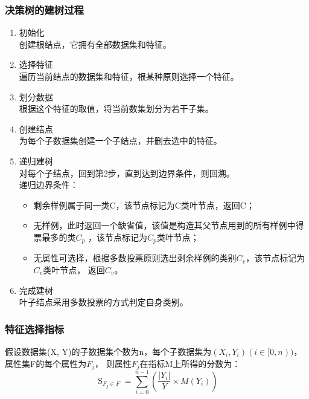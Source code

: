 \documentclass[UTF8,a4paper,12pt]{article}
\begin{document}
\subsubsection{决策树的建树过程}
\begin{enumerate}[itemindent=0.5em,label=\arabic*、]
  \item 初始化\\创建根结点，它拥有全部数据集和特征。
  \item 选择特征\\遍历当前结点的数据集和特征，根某种原则选择一个特征。
  \item 划分数据\\根据这个特征的取值，将当前数集划分为若干子集。
  \item 创建结点\\为每个子数据集创建一个子结点，并删去选中的特征。
  \item 递归建树\\对每个子结点，回到第2步，直到达到边界条件，则回溯。\\
  递归边界条件：
  \begin{itemize}
    \item 剩余样例属于同一类C，该节点标记为C类叶节点，返回C；
    \item 无样例，此时返回一个缺省值，该值是构造其父节点用到的所有样例中得票最多的类$C_p$
    ，该节点标记为$C_p$类叶节点；
    \item 无属性可选择，根据多数投票原则选出剩余样例的类别$C_v$，该节点标记为$C_v$类叶节点，
    返回$C_v$。
  \end{itemize}
  \item 完成建树\\叶子结点采用多数投票的方式判定自身类别。
\end{enumerate}
\subsubsection{特征选择指标}
\par 假设数据集(X, Y)的子数据集个数为n，每个子数据集为$(X_i, Y_i)(i \in [0, n))$，属性集F的每个属性为$F_j$，
则属性$F_j$在指标M上所得的分数为：
\begin{equation}
  \mathop{S(Y|F_j)}_{F_j \in F} = \sum_{i=0}^{n-1}(\frac{|Y_i|}{Y} \times M(Y_i))
\end{equation}
\end{document}
